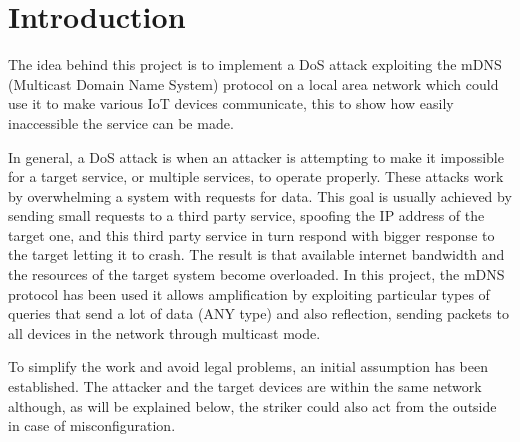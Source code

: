 \documentclass[fleqn, 11pt]{SelfArx} %
\affiliation{\textit{Department of Computer Engineering, University of Pavia, Pavia, Italy}} %
\affiliation{\textit{Enterprise Digital Infrastructure}} %
\begin{document}
\maketitle %

\tableofcontents %

\thispagestyle{empty} %


\section{Introduction} %
The idea behind this project is to implement a DoS attack exploiting the mDNS (Multicast Domain Name System) protocol \cite{rfc6762} on a local area network which could use it to make various IoT devices communicate, this to show how easily inaccessible the service can be made. \newline

In general, a DoS attack is when an attacker is attempting to make it impossible for a target service, or multiple services, to operate properly. These attacks work by overwhelming a system with requests for data. \newline
This goal is usually achieved by sending small requests to a third party service, spoofing the IP address of the target one, and this third party service in turn respond with bigger response to the target letting it to crash. \newline The result is that available internet bandwidth and the resources of the target system become overloaded.\newline
In this project, the mDNS protocol has been used it allows amplification by exploiting particular types of queries that send a lot of data (ANY type) and also reflection, sending packets to all devices in the network through multicast mode. \newline

To simplify the work and avoid legal problems, an initial assumption has been established. The attacker and the target devices are within the same network although, as will be explained below, the striker could also act from the outside in case of misconfiguration.
\end{document}
